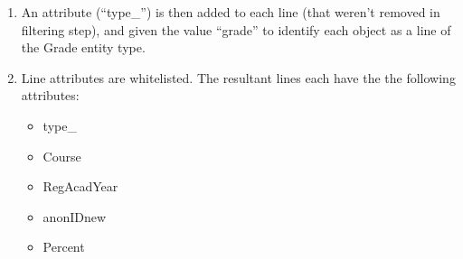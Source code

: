 \begin{enumerate}
  \item An attribute (``type\_'') is then added to each line (that weren't removed in filtering step), and given the value ``grade'' to identify each object as a line of the Grade entity type.
  \item Line attributes are whitelisted. The resultant lines each have the the following attributes:
        \begin{itemize}
          \item type\_
          \item Course
          \item RegAcadYear
          \item anonIDnew
          \item Percent
        \end{itemize}
\end{enumerate}

